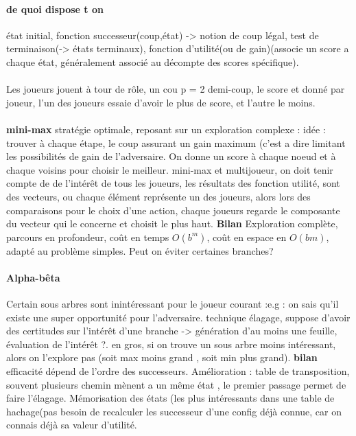 \documentclass{article}
\begin{document}
\paragraph{de quoi dispose t on } état initial, fonction successeur(coup,état) -> notion de coup légal, test de terminaison(-> états terminaux), fonction d'utilité(ou de gain)(associe un score a chaque état, généralement associé au décompte des scores spécifique).\\\\
Les joueurs jouent à tour de rôle, un cou p = 2 demi-coup, le score et donné par joueur, l'un des joueurs essaie d'avoir le plus de score, et l'autre le moins.\\\\\textbf{mini-max} stratégie optimale, reposant sur un exploration complexe : idée : trouver à chaque étape, le coup assurant un gain maximum (c’est a dire limitant les possibilités de gain de l'adversaire. On donne un score à chaque noeud et à chaque voisins pour choisir le meilleur. mini-max et multijoueur, on doit tenir compte de de l’intérêt de tous les joueurs, les résultats des fonction utilité, sont des vecteurs, ou chaque élément représente un des joueurs, alors lors des comparaisons pour le choix d'une action, chaque joueurs regarde le composante du vecteur qui le concerne et choisit le plus haut. \textbf{Bilan} Exploration complète, parcours en profondeur, coût en temps $O(b^m)$, coût en espace en $O(bm)$, adapté au problème simples. Peut on éviter certaines branches?
\paragraph{Alpha-bêta} Certain sous arbres sont inintéressant pour le joueur courant :e.g : on sais qu'il existe une super opportunité pour l'adversaire. technique élagage, suppose d'avoir des certitudes sur l’intérêt d'une branche -> génération d'au moins une feuille, évaluation  de l’intérêt ?. en gros, si on trouve un sous arbre moins intéressant, alors on l'explore pas (soit max moins grand , soit min plus grand). \textbf{bilan} efficacité dépend de l’ordre des successeurs. Amélioration : table de transposition, souvent plusieurs chemin mènent a un même état , le premier passage permet de faire l'élagage. Mémorisation des états (les plus intéressants dans une table de hachage(pas besoin de recalculer les successeur d'une config déjà connue, car on connais déjà sa valeur d'utilité.
\end{document}

